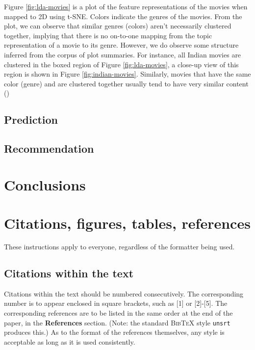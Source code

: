 \documentclass{article} %
\begin{document}
Figure \ref{fig:lda-movies} is a plot of the feature representations of the
movies when mapped to 2D using t-SNE. Colors indicate the genres of the movies.
From the plot, we can observe that similar genres (colors) aren't necessarily
clustered together, implying that there is no on-to-one mapping from the topic
representation of a movie to its genre. However, we do observe some structure 
inferred from the corpus of plot summaries. For instance, all Indian movies
are clustered in the boxed region of Figure \ref{fig:lda-movies}, a close-up
view of this region is shown in Figure \ref{fig:indian-movies}. Similarly, 
movies that have the same color (genre) and are clustered together usually
tend to have very similar content ()

\subsection{Prediction}




\subsection{Recommendation}









\section{Conclusions}


\section{Citations, figures, tables, references}
\label{others}

These instructions apply to everyone, regardless of the formatter being used.

\subsection{Citations within the text}

Citations within the text should be numbered consecutively. The corresponding
number is to appear enclosed in square brackets, such as [1] or [2]-[5]. The
corresponding references are to be listed in the same order at the end of the
paper, in the \textbf{References} section. (Note: the standard
\textsc{Bib\TeX} style \texttt{unsrt} produces this.) As to the format of the
references themselves, any style is acceptable as long as it is used
consistently.
\end{document}
